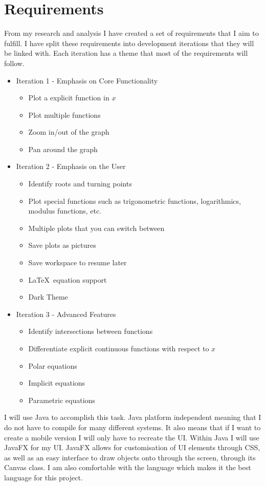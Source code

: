 \documentclass[../../../main.tex]{subfiles}
\begin{document}
\chapter{Requirements}
From my research and analysis I have created a set of requirements that I aim to fulfill. I have split these requirements into development iterations that they will be linked with. Each iteration has a theme that most of the requirements will follow.
\begin{itemize}
	\item Iteration 1 - Emphasis on Core Functionality
		\begin{itemize}
			\item Plot a explicit function in $x$
			\item Plot multiple functions
			\item Zoom in/out of the graph
			\item Pan around the graph
		\end{itemize}
	\item Iteration 2 - Emphasis on the User
		\begin{itemize}
			\item Identify roots and turning points 
			\item Plot special functions such as trigonometric functions, logarithmics, modulus functions, etc.
			\item Multiple plots that you can switch between
			\item Save plots as pictures
			\item Save workspace to resume later
			\item \LaTeX \ equation support
			\item Dark Theme
		\end{itemize}
	\item Iteration 3 - Advanced Features
		\begin{itemize}
			\item Identify intersections between functions
			\item Differentiate explicit continuous functions with respect to $x$
			\item Polar equations
			\item Implicit equations
			\item Parametric equations
		\end{itemize}
\end{itemize}
I will use Java to accomplish this task. Java platform independent meaning that I do not have to compile for many different systems. It also means that if I want to create a mobile version I will only have to recreate the UI. Within Java I will use JavaFX for my UI. JavaFX allows for customisation of UI elements through CSS, as well as an easy interface to draw objects onto through the screen, through its Canvas class.  I am also comfortable with the language which makes it the best language for this project.
\end{document}
